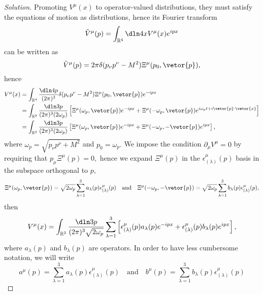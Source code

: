 \begin{proof}[Solution]
   Promoting \(V^\mu(x)\) to operator-valued distributions, they must satisfy the equations of motion as distributions, hence its Fourier transform
   \begin{equation*}
      \tilde{V}^\mu(p) = \int_{\mathbb{R}^4} \dln4{x} V^\mu(x) e^{ipx}
   \end{equation*}
   can be written as
   \begin{equation*}
      \tilde{V}^\mu(p) = 2\pi \delta(p_\nu p^\nu - M^2) \Xi^\mu(p_0, \vetor{p}),
   \end{equation*}
   hence
   \begin{align*}
      V^\mu(x) &= \int_{\mathbb{R}^4} \frac{\dln4p}{(2\pi)^3} \delta(p_\nu p^\nu - M^2) \Xi^\mu(p_0, \vetor{p}) e^{-ipx}\\
               &= \int_{\mathbb{R}^3} \frac{\dln3p}{(2\pi)^3(2 \omega_p)} \left[\Xi^\mu(\omega_p, \vetor{p}) e^{-i px} + \Xi^\mu(-\omega_p, \vetor{p}) e^{i \omega_p t + i \vetor{p} \cdot \vetor{x}}\right]\\
               &= \int_{\mathbb{R}^3} \frac{\dln3p}{(2\pi)^3(2 \omega_p)} \left[\Xi^\mu(\omega_p, \vetor{p}) e^{-ipx} + \Xi^\mu(-\omega_p, -\vetor{p}) e^{i px}\right],
   \end{align*}
   where \(\omega_p = \sqrt{p_\nu p^\nu + M^2}\) and \(p_0 = \omega_p.\) We impose the condition \(\partial_\mu V^\mu = 0\) by requiring that \(p_\mu \Xi^\mu(p) = 0,\) hence we expand \(\Xi^\mu(p)\) in the \(\epsilon^\mu_{(\lambda)}(p)\) basis in the subspace orthogonal to \(p,\)
   \begin{equation*}
      \Xi^\mu(\omega_p, \vetor{p}) = \sqrt{2 \omega_p} \sum_{\lambda = 1}^3 a_{\lambda}(p)\epsilon^\mu_{(\lambda)}(p)
      \quad\text{and}\quad
      \Xi^\mu(-\omega_p, -\vetor{p}) = \sqrt{2 \omega_p} \sum_{\lambda = 1}^3 b_{\lambda}(p)\epsilon^\mu_{(\lambda)}(p),
   \end{equation*}
   then
   \begin{equation*}
      V^{\mu}(x) = \int_{\mathbb{R}^3} \frac{\dln3p}{(2\pi)^3 \sqrt{2 \omega_p}} \sum_{\lambda = 1}^3 \left[\epsilon_{(\lambda)}^\mu(p) a_{\lambda}(p) e^{-ipx} + \epsilon_{(\lambda)}^{\mu}(p) b_{\lambda}(p) e^{ipx}\right],
   \end{equation*}
   where \(a_\lambda(p)\) and \(b_\lambda(p)\) are operators. In order to have less cumbersome notation, we will write
   \begin{equation*}
       a^\mu(p) = \sum_{\lambda = 1}^3 a_{\lambda}(p)\epsilon^\mu_{(\lambda)}(p)
       \quad\text{and}\quad
       b^\mu(p) = \sum_{\lambda = 1}^3 b_{\lambda}(p)\epsilon^\mu_{(\lambda)}(p)

\end{equation*}
\end{proof}
